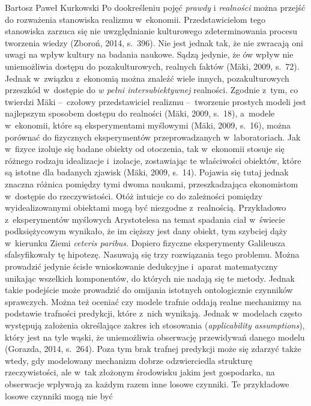 \begin{artplenv}{Bartosz Paweł Kurkowski}
Po dookreśleniu pojęć \textit{prawdy }i \textit{realności }można przejść do rozważenia stanowiska realizmu w~ekonomii.
Przedstawicielom tego stanowiska zarzuca się nie uwzględnianie kulturowego zdeterminowania procesu tworzenia wiedzy
\label{ref:RND4gEoEgP0rf}(Zboroń, 2014, s.~396). Nie jest jednak tak, że nie zwracają oni uwagi na wpływ kultury na
badania naukowe. Sądzą jedynie, że ów wpływ nie uniemożliwia dostępu do pozakulturowych, realnych faktów
\label{ref:RND5PVTJKeItB}(Mäki, 2009, s.~72). Jednak w~związku z~ekonomią można znaleźć wiele innych, pozakulturowych
przeszkód w~dostępie do \textit{w pełni intersubiektywnej} realności. Zgodnie z~tym, co twierdzi Mäki --~czołowy
przedstawiciel realizmu --~tworzenie prostych modeli jest najlepszym sposobem dostępu do realności
\label{ref:RNDAEWrNNvzgu}(Mäki, 2009, s.~18), a~modele w~ekonomii, które są eksperymentami myślowymi
\label{ref:RNDOziK5D8KLR}(Mäki, 2009, s.~16), można porównać do fizycznych eksperymentów
przeprowadzanych w~laboratoriach. Jak w~fizyce izoluje się badane obiekty od otoczenia,
tak w~ekonomii stosuje się różnego rodzaju
idealizacje i~izolacje, zostawiając te właściwości obiektów, które są istotne dla badanych zjawisk
\label{ref:RNDjPm2vR6GSw}(Mäki, 2009, s.~14). Pojawia się tutaj jednak znaczna różnica pomiędzy tymi dwoma naukami,
przeszkadzająca ekonomistom w~dostępie do rzeczywistości. Otóż intuicje co do zależności pomiędzy wyidealizowanymi
obiektami mogą być niezgodne z~realnością. Przykładowo z~eksperymentów myślowych Arystotelesa na temat spadania
ciał w~świecie podksiężycowym wynikało, że im cięższy jest dany obiekt, tym szybciej dąży w~kierunku Ziemi \textit{ceteris
paribus}. Dopiero fizyczne eksperymenty Galileusza sfalsyfikowały tę hipotezę. Nasuwają się trzy rozwiązania tego
problemu. Można prowadzić jedynie ścisłe wnioskowanie dedukcyjne i~aparat matematyczny unikając wszelkich komponentów,
do których nie nadają się te metody. Jednak takie podejście może prowadzić do omijania istotnych ontologicznie
czynników sprawczych. Można też oceniać czy modele trafnie oddają realne mechanizmy na podstawie trafności predykcji,
które z~nich wynikają. Jednak w~modelach często występują założenia określające zakres ich stosowania
(\textit{applicability assumptions}), który jest na tyle wąski, że uniemożliwia obserwację przewidywań danego modelu
\label{ref:RND4xP2eHEyv0}(Gorazda, 2014, s.~264). Poza tym brak trafnej predykcji może się zdarzyć także wtedy, gdy
modelowany mechanizm dobrze odzwierciedla strukturę rzeczywistości, ale w~tak złożonym środowisku jakim jest
gospodarka, na obserwacje wpływają za każdym razem inne losowe czynniki. Te przykładowe losowe czynniki mogą nie być

\end{artplenv}
